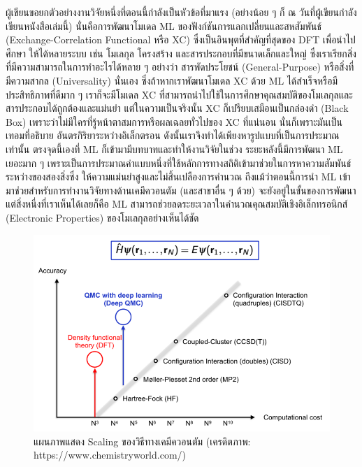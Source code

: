 ผู้เขียนขอยกตัวอย่างงานวิจัยหนึ่งที่ตอนนี้กำลังเป็นหัวข้อที่มาแรง (อย่างน้อย ๆ ก็ ณ วันที่ผู้เขียนกำลังเขียนหนังสือเล่มนี้) นั่นคือการพัฒนาโมเดล ML 
ของฟังก์ชันการแลกเปลี่ยนและสหสัมพันธ์ (Exchange-Correlation Functional หรือ XC) ซึ่งเป็นอินพุตที่สำคัญที่สุดของ DFT เพื่อนำไปศึกษา%
ให้ได้หลายระบบ เช่น โมเลกุล โครงสร้าง และสารประกอบที่มีขนาดเล็กและใหญ่ ซึ่งเราเรียกสิ่งที่มีความสามารถในการทำอะไรได้หลาย ๆ อย่างว่า%
สารพัดประโยชน์ (General-Purpose) หรือสิ่งที่มีความสากล (Universality) นั่นเอง ซึ่งถ้าหากเราพัฒนาโมเดล XC ด้วย ML ได้สำเร็จหรือมี%
ประสิทธิภาพที่ดีมาก ๆ เราก็จะมีโมเดล XC ที่สามารถนำไปใช้ในการศึกษาคุณสมบัติของโมเลกุลและสารประกอบได้ถูกต้องและแม่นยำ แต่ในความเป็นจริงนั้น 
XC ก็เปรียบเสมือนเป็นกล่องดำ (Black Box) เพราะว่าไม่มีใครที่รู้หน้าตาสมการหรือผลเฉลยทั่วไปของ XC ที่แน่นอน นั่นก็เพราะมันเป็นเทอมที่อธิบาย%
อันตรกิริยาระหว่างอิเล็กตรอน ดังนั้นเราจึงทำได้เพียงหารูปแบบที่เป็นการประมาณเท่านั้น ตรงจุดนี้เองที่ ML ก็เข้ามามีบทบาทและทำให้งานวิจัยในช่วง%
ระยะหลังนี้มีการพัฒนา ML เยอะมาก ๆ เพราะเป็นการประมาณค่าแบบหนึ่งที่ใช้หลักการทางสถิติเข้ามาช่วยในการหาความสัมพันธ์ระหว่างของสองสิ่งซึ่ง%
ให้ความแม่นยำสูงและไม่สิ้นเปลืองการคำนวณ ถึงแม้ว่าตอนนี้การนำ ML เข้ามาช่วยสำหรับการทำงานวิจัยทางด้านเคมึควอนตัม (และสาขาอื่น ๆ ด้วย) 
จะยังอยู่ในขั้นของการพัฒนา แต่สิ่งหนึ่งที่เราเห็นได้เลยก็คือ ML สามารถช่วยลดระยะเวลาในคำนวณคุณสมบัติเชิงอิเล็กทรอนิกส์ (Electronic Properties) 
ของโมเลกุลอย่างเห็นได้ชัด

\begin{figure}[H]
    \centering
    \includegraphics[width=0.8\linewidth]{fig/qm_scaling.png}
    \caption{แผนภาพแสดง Scaling ของวิธีทางเคมีควอนตัม (เครดิตภาพ: https://www.chemistryworld.com/)}
    \label{fig:qm_scaling}
\end{figure}

